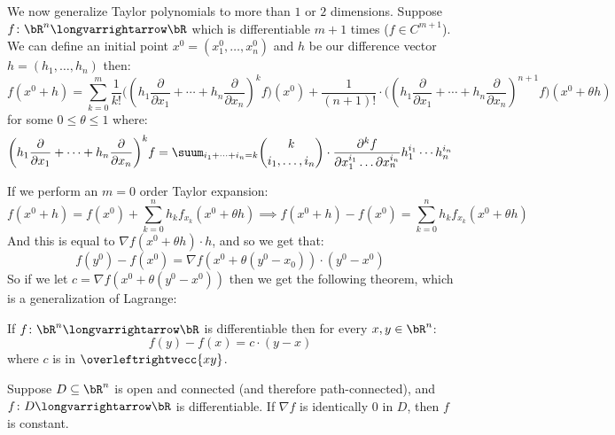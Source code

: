\documentclass[10pt]{article}
\let\lineseg=\overleftrightvecc
\begin{document}


\bigskip

We now generalize Taylor polynomials to more than $1$ or $2$ dimensions.
Suppose $f\colon\bR^n\longvarrightarrow\bR$ which is differentiable $m+1$ times ($f\in C^{m+1}$).
We can define an initial point $x^0=(x^0_1,\dots,x^0_n)$ and $h$ be our difference vector $h=(h_1,\dots,h_n)$ then:
\[ f(x^0+h) = \sum_{k=0}^m\frac1{k!}\biggl(\left(h_1\frac\partial{\partial x_1}+\cdots+h_n\frac\partial{\partial x_n}\right)^kf\biggr)(x^0)+
\frac1{(n+1)!}\cdot\biggr(\left(h_1\frac\partial{\partial x_1}+\cdots+h_n\frac\partial{\partial x_n}\right)^{n+1}f\biggr)(x^0+\theta h) \]
for some $0\leq\theta\leq1$ where:
\[ \left(h_1\frac\partial{\partial x_1}+\cdots+h_n\frac\partial{\partial x_n}\right)^kf =
\suum_{i_1+\cdots+i_n=k}\binom k{i_1,\dots,i_n}\cdot\frac{\partial^k f}{\partial x_1^{i_1}\dots\partial x_n^{i_n}}h_1^{i_1}\cdots h_n^{i_n} \]

If we perform an $m=0$ order Taylor expansion:
\[ f(x^0+h) = f(x^0) + \sum_{k=0}^n h_k f_{x_k}(x^0+\theta h) \implies f(x^0+h) - f(x^0) = \sum_{k=0}^n h_k f_{x_k}(x^0+\theta h) \]
And this is equal to $\nabla f(x^0+\theta h)\cdot h$, and so we get that:
\[ f(y^0) - f(x^0) = \nabla f(x^0+\theta(y^0-x_0))\cdot(y^0-x^0) \]
So if we let $c=\nabla f(x^0+\theta(y^0-x^0))$ then we get the following theorem, which is a generalization of Lagrange:

\begin{thrm*}

    If $f\colon\bR^n\longvarrightarrow\bR$ is differentiable then for every $x,y\in\bR^n$:
    \[ f(y)-f(x)=c\cdot(y-x) \]
    where $c$ is in $\lineseg{xy}$.

\end{thrm*}

\begin{coro*}

    Suppose $D\subseteq\bR^n$ is open and connected (and therefore path-connected), and $f\colon D\longvarrightarrow\bR$ is differentiable.
    If $\nabla f$ is identically $0$ in $D$, then $f$ is constant.

\end{coro*}
\end{document}
